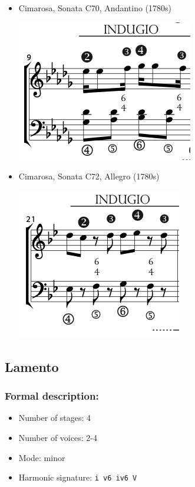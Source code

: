 \documentclass[11pt, openany]{article}
\begin{document}
\begin{itemize}
\item Cimarosa, Sonata C70, Andantino (1780s)
\begin{center}
\includegraphics[scale=0.5]{cimarosa70.png}
\end{center}
\item Cimarosa, Sonata C72, Allegro (1780s)
\begin{center}
\includegraphics[scale=0.5]{cimarosa72.png}
\end{center}
\end{itemize}


	\subsection{Lamento}
	
\subsubsection{Formal description:}
\begin{itemize}
\item Number of stages: 4
\item Number of voices: 2-4
\item Mode: minor
\item Harmonic signature: \texttt{i v6 iv6 V}
\end{itemize}
\end{document}
